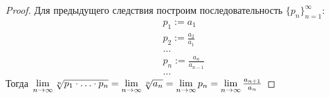 \begin{proof}
	Для предыдущего следствия построим последовательность $\{p_n\}_{n = 1}^\infty$:
	\begin{align*}
		&{p_1 := a_1}
		\\
		&{p_2 := \frac{a_2}{a_1}}
		\\
		&{\ldots}
		\\
		&{p_n := \frac{a_n}{a_{n - 1}}}
		\\
		&{\ldots}
	\end{align*}
	Тогда $\lim\limits_{n \to \infty} \sqrt[n]{p_1 \cdot \ldots \cdot p_n} = \lim\limits_{n \to \infty} \sqrt[n]{a_n} = \lim\limits_{n \to \infty} p_n = \lim\limits_{n \to \infty} \frac{a_{n + 1}}{a_n}$
\end{proof}